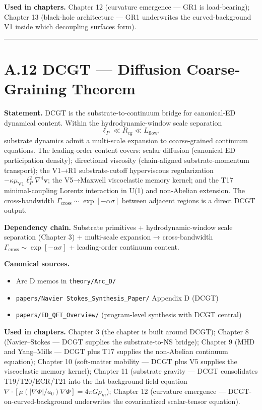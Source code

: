 \documentclass[11pt]{book}
\begin{document}
\textbf{Used in chapters.} Chapter 12 (curvature emergence — GR1 is load-bearing); Chapter 13 (black-hole architecture — GR1 underwrites the curved-background V1 inside which decoupling surfaces form).

\bigskip\hrule\bigskip

\section{A.12 DCGT — Diffusion Coarse-Graining Theorem}

\textbf{Statement.} DCGT is the substrate-to-continuum bridge for canonical-ED dynamical content. Within the hydrodynamic-window scale separation
\[
\ell_P \ll R_\mathrm{cg} \ll L_\mathrm{flow},
\]
substrate dynamics admit a multi-scale expansion to coarse-grained continuum equations. The leading-order content covers: scalar diffusion (canonical ED participation density); directional viscosity (chain-aligned substrate-momentum transport); the V1→R1 substrate-cutoff hyperviscous regularization $-\kappa\mu_\mathrm{V1}\ell_P^2\nabla^4\mathbf{v}$; the V5→Maxwell viscoelastic memory kernel; and the T17 minimal-coupling Lorentz interaction in U(1) and non-Abelian extension. The cross-bandwidth $\Gamma_\mathrm{cross}\sim \exp[-\alpha\sigma]$ between adjacent regions is a direct DCGT output.

\textbf{Dependency chain.} Substrate primitives + hydrodynamic-window scale separation (Chapter 3) + multi-scale expansion → cross-bandwidth $\Gamma_\mathrm{cross}\sim\exp[-\alpha\sigma]$ + leading-order continuum content.

\textbf{Canonical sources.}
\begin{itemize}
\item Arc D memos in \texttt{theory/Arc\_D/}
\item \texttt{papers/Navier Stokes\_Synthesis\_Paper/} Appendix D (DCGT)
\item \texttt{papers/ED\_QFT\_Overview/} (program-level synthesis with DCGT central)
\end{itemize}

\textbf{Used in chapters.} Chapter 3 (the chapter is built around DCGT); Chapter 8 (Navier–Stokes — DCGT supplies the substrate-to-NS bridge); Chapter 9 (MHD and Yang–Mills — DCGT plus T17 supplies the non-Abelian continuum equation); Chapter 10 (soft-matter mobility — DCGT plus V5 supplies the viscoelastic memory kernel); Chapter 11 (substrate gravity — DCGT consolidates T19/T20/ECR/T21 into the flat-background field equation $\nabla\cdot[\mu(|\nabla\Phi|/a_0)\nabla\Phi] = 4\pi G\rho_m$); Chapter 12 (curvature emergence — DCGT-on-curved-background underwrites the covariantized scalar-tensor equation).
\end{document}
